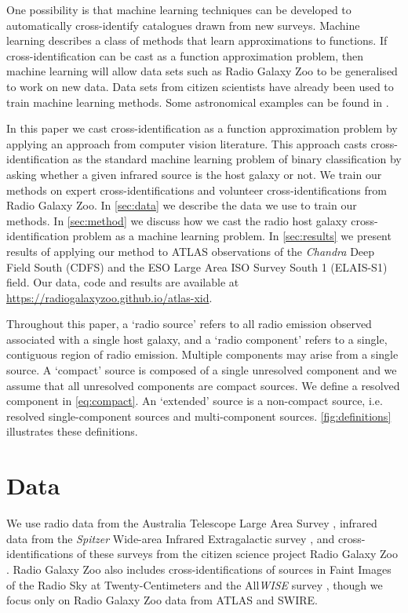 \documentclass[fleqn,usenatbib,usedcolumn]{mnras}
\newcommand{\edited}[1]{#1}
\begin{document}
  \edited{One possibility is that machine learning techniques can
  be developed to automatically cross-identify catalogues drawn from new surveys}. Machine learning
  describes a class of methods that learn approximations to functions. \edited{If
  cross-identification can be cast as a function approximation problem, then machine learning will allow data
  sets such as Radio Galaxy Zoo to be generalised to work on new data. Data sets from
  citizen scientists have already been used to train machine learning methods.
  Some astronomical examples can be found in \citet{marshall15citizenscience}.}

  In this paper we \edited{cast cross-identification as a function
  approximation problem by} applying an approach from computer vision
  literature. This approach casts cross-identification as the standard machine
  learning problem of binary classification \edited{by asking whether a given
  infrared source is the host galaxy or not}. We train our methods on expert
  cross-identifications and volunteer cross-identifications from Radio Galaxy Zoo. In
  \autoref{sec:data} we describe the data we use to train our methods. In
  \autoref{sec:method} we discuss how we cast the radio host galaxy
  cross-identification problem as a machine learning problem. In
  \autoref{sec:results} we present results of applying our method to ATLAS
  observations of the \emph{Chandra} Deep Field South (CDFS) and the ESO Large Area ISO Survey South 1 (ELAIS-S1) field. Our data, code and results are
  available at \url{https://radiogalaxyzoo.github.io/atlas-xid}.

  \edited{Throughout this paper, a `radio source' refers to all radio emission observed associated with a single host galaxy, and a `radio component' refers to a single, contiguous
  region of radio emission. Multiple components may arise from a single
  source. A `compact' source is composed of a \edited{single unresolved component} and we
  assume that all unresolved components are compact sources. \edited{We define a resolved component in \autoref{eq:compact}.} An `extended'
  source is a non-compact source, i.e. resolved single-component sources and
  multi-component sources. \autoref{fig:definitions} illustrates these definitions.}

\section{Data}\label{sec:data}

  We use radio data from the Australia Telescope Large Area Survey
  \citep[ATLAS;][]{norris06,franzen15}, infrared data from the \emph{Spitzer}
  Wide-area Infrared Extragalactic survey \citep[SWIRE;][]{lonsdale03swire,
  surace05swire}, and cross-identifications of these surveys from the citizen
  science project Radio Galaxy Zoo \citep{banfield15}. Radio Galaxy Zoo also
  includes cross-identifications of sources in Faint Images of the Radio Sky at
  Twenty-Centimeters \citep[FIRST;][]{white97first} and the All\emph{WISE}
  survey \citep{cutri2013wiseexplanatory}, though we focus only on Radio
  Galaxy Zoo data from ATLAS and SWIRE.
\end{document}
